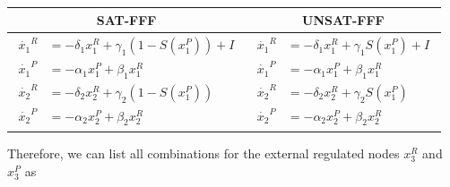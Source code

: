 {
    \setlength{\tabcolsep}{12pt}
    \renewcommand{\arraystretch}{4.5}
\begin{table}[H]
    \centering
    \vspace{0.2cm}
    \hspace{-0.6cm}
    \begin{tabular}{|c|c|}
        \hline
        \textbf{SAT-FFF} & \textbf{UNSAT-FFF} \\
        \hline
        $\begin{aligned}
            \dot{x_1}^R &= -\delta_1 x_1^R + \gamma_1(1-S(x_1^P)) + I\\
            \dot{x_1}^P &= -\alpha_1 x_1^P + \beta_1 x_1^R\\
            \dot{x_2}^R &= -\delta_2 x_2^R + \gamma_2(1-S(x_1^P))\\
            \dot{x_2}^P &= -\alpha_2 x_2^P + \beta_2 x_2^R
        \end{aligned}$ & 
        $\begin{aligned}
            \dot{x_1}^R &= -\delta_1 x_1^R + \gamma_1 S(x_1^P) + I\\
            \dot{x_1}^P &= -\alpha_1 x_1^P + \beta_1 x_1^R\\
            \dot{x_2}^R &= -\delta_2 x_2^R + \gamma_2S(x_1^P)\\
            \dot{x_2}^P &= -\alpha_2 x_2^P + \beta_2 x_2^R
        \end{aligned}$ \\[0.70cm]
        \hline

    \end{tabular}
\end{table}
}

Therefore, we can list all combinations for the external 
regulated nodes $x_3^R$ and $x_3^P$ as 

